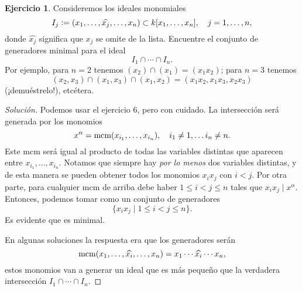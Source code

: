 \documentclass{article}
\theoremstyle{definition}
\newtheorem{ejerc}{Ejercicio}
\newenvironment{solucion}{\begin{proof}[Solución]}{\end{proof}}
\begin{document}
\begin{ejerc}
  Consideremos los ideales monomiales
  \[ I_j \mathrel{\mathop:}= (x_1,\ldots, \widehat{x_j}, \ldots, x_n) \subset
     k [x_1,\ldots,x_n], \quad j = 1,\ldots,n, \]
  donde $\widehat{x_j}$ significa que $x_j$ se omite de la lista. Encuentre el
  conjunto de generadores minimal para el ideal
  $$I_1\cap \cdots \cap I_n.$$
  Por ejemplo, para $n = 2$ tenemos $(x_2)\cap (x_1) = (x_1 x_2)$; para $n = 3$
  tenemos
  $$(x_2,x_3) \cap (x_1,x_3) \cap (x_1,x_2) = (x_1 x_2, x_1 x_3, x_2 x_3)$$
  (¡demuéstrelo!), etcétera.

  \ifdefined\solutions\begin{solucion}
    Podemos usar el ejercicio 6, pero con cuidado. La intersección será generada
    por los monomios
    $$x^\alpha = \operatorname{mcm} (x_{i_1},\ldots,x_{i_n}), \quad i_1 \ne 1, \ldots i_n \ne n.$$
    Este mcm será igual al producto de todas las variables distintas que
    aparecen entre $x_{i_1},\ldots,x_{i_n}$. Notamos que siempre hay
    \emph{por lo menos} dos variables distintas, y de esta manera se pueden
    obtener todos los monomios $x_i x_j$ con $i < j$. Por otra parte, para
    cualquier mcm de arriba debe haber $1 \le i < j \le n$ tales que
    $x_i x_j \mid x^\alpha$. Entonces, podemos tomar como un conjunto de
    generadores
    $$\{ x_i x_j \mid 1 \le i < j \le n \}.$$
    Es evidente que es minimal.

    En algunas soluciones la respuesta era que los generadores serán
    $$\operatorname{mcm} (x_1,\ldots,\widehat{x_i},\ldots,x_n) = x_1\cdots\widehat{x_i}\cdots x_n,$$
    estos monomios van a generar un ideal que es más pequeño que la verdadera
    intersección $I_1\cap\cdots\cap I_n$.
  \end{solucion}\fi
\end{ejerc}
\end{document}
